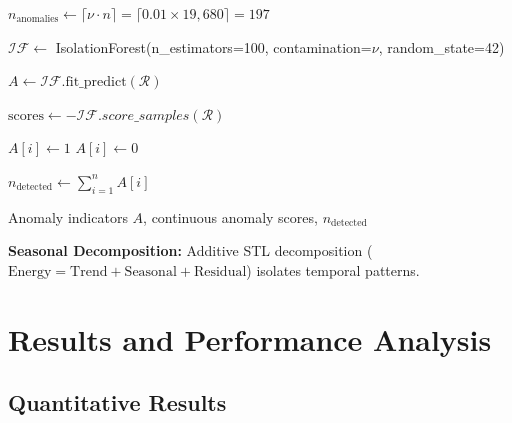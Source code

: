 \documentclass[11pt, a4paper, oneside]{article}
\begin{document}
\begin{algorithm}[H]
\caption{Anomaly Detection via Isolation Forest}
\label{alg:anomaly_detection}
\begin{algorithmic}[1]

\State $n_{\text{anomalies}} \gets \lceil \nu \cdot n \rceil = \lceil 0.01 \times 19,680 \rceil = 197$ 

\State $\mathcal{IF} \gets$ IsolationForest(n\_estimators=100, contamination=$\nu$, random\_state=42)

\State $A \gets \mathcal{IF}.\text{fit\_predict}(\mathcal{R})$ 

\State $\text{scores} \gets -\mathcal{IF}.score\_samples(\mathcal{R})$ 

        \State $A[i] \gets 1$ 
    \Else
        \State $A[i] \gets 0$ 
    \EndIf
\EndFor

\State $n_{\text{detected}} \gets \sum_{i=1}^{n} A[i]$ 

\State \Return Anomaly indicators $A$, continuous anomaly scores, $n_{\text{detected}}$
\end{algorithmic}
\end{algorithm}

\textbf{Seasonal Decomposition:} Additive STL decomposition ($\text{Energy} = \text{Trend} + \text{Seasonal} + \text{Residual}$) isolates temporal patterns.

\newpage


\section{Results and Performance Analysis}
\label{sec:results}

\subsection{Quantitative Results}
\end{document}
